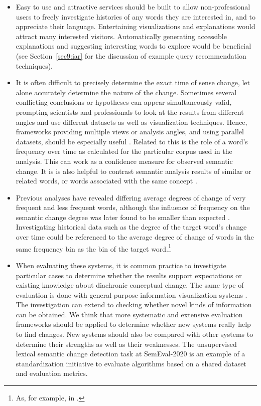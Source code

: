 \documentclass[output=paper]{langsci/langscibook}
\begin{document}
\begin{itemize}\sloppy
\item Easy to use and attractive services should be built to allow non-professional users to freely investigate histories of any words they are interested in, and to appreciate their language. Entertaining visualizations and explanations would  attract many interested visitors. Automatically generating accessible explanations and suggesting interesting words to explore would be beneficial (see Section~\ref{sec9:iar} for the discussion of example query recommendation techniques).

\item It is often difficult to precisely determine the exact time of sense change, let alone accurately determine the nature of the change. Sometimes several conflicting conclusions or hypotheses can appear simultaneously valid, prompting scientists and professionals to look at the results from different angles and use different datasets as well as visualization techniques.
Hence, frameworks providing multiple  views or analysis angles, and using parallel datasets, should be especially useful \citep[e.g.][]{jatowt2018every,kalouli2019parhistvis,jeseme}. Related to this is the role of a word's frequency over time as calculated for the particular corpus used in the analysis. This can work as a confidence measure for observed semantic change. It is is also helpful to contrast semantic analysis results of similar or related words, or words associated with the same concept  \citep[e.g.][]{jatowt2018every}.

\item Previous analyses \citep{hamilton-etal-2016-diachronic,pagel2007frequency,lieberman2007quantifying} have revealed differing average degrees of change of very frequent and less frequent words, although the influence of frequency on the semantic change degree was later found to be smaller than expected \citep{dubossarsky-etal-2017-outta}. Investigating historical data such as the degree of the target word's change over time could be  referenced to the average degree of change of words in the same frequency bin as the bin of the target word.\footnote{As, for example, in \citet{jatowt2018every}.}
\item When evaluating these systems, it is common practice to investigate particular cases to determine whether the results support expectations or existing knowledge about diachronic conceptual change. The same type of evaluation is done with general purpose information visualization systems \citep{carpendale2008}. The investigation can extend to checking whether novel kinds of information can be obtained. We think that more systematic and extensive evaluation frameworks should be applied to determine whether new systems really help to find changes. New systems should also be compared with other systems to determine their strengths as well as their weaknesses. The unsupervised lexical semantic change detection task \citep{schlechtweg-etal-2020-semeval} at SemEval-2020 is an example of a  standardization initiative to evaluate algorithms based on a shared dataset and evaluation metrics. 


\end{itemize}
\end{document}
